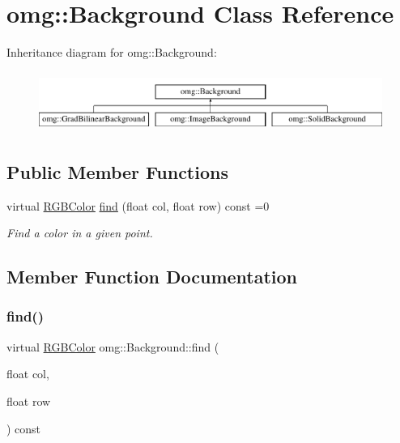 \hypertarget{classomg_1_1_background}{}\section{omg\+::Background Class Reference}
\label{classomg_1_1_background}
Inheritance diagram for omg\+::Background\+:\begin{figure}[H]
\begin{center}
\leavevmode
\includegraphics[height=1.985816cm]{classomg_1_1_background}
\end{center}
\end{figure}
\subsection*{Public Member Functions}
\begin{DoxyCompactItemize}
\item 
virtual \mbox{\hyperlink{namespaceomg_a92d9bbc48ad35def2aa4b0ac3a5b22ae}{R\+G\+B\+Color}} \mbox{\hyperlink{classomg_1_1_background_a9f98d6bc2e213de258b5c3e45040b462}{find}} (float col, float row) const =0
\begin{DoxyCompactList}\small\item\em Find a color in a given point. \end{DoxyCompactList}\end{DoxyCompactItemize}


\subsection{Member Function Documentation}
\mbox{\label{classomg_1_1_background_a9f98d6bc2e213de258b5c3e45040b462}} 
\subsubsection{\texorpdfstring{find()}{find()}}
{\footnotesize\ttfamily virtual \mbox{\hyperlink{namespaceomg_a92d9bbc48ad35def2aa4b0ac3a5b22ae}{R\+G\+B\+Color}} omg\+::\+Background\+::find (\begin{DoxyParamCaption}\item[{float}]{col,  }\item[{float}]{row }\end{DoxyParamCaption}) const\hspace{0.3cm}{\ttfamily [pure virtual]}}



